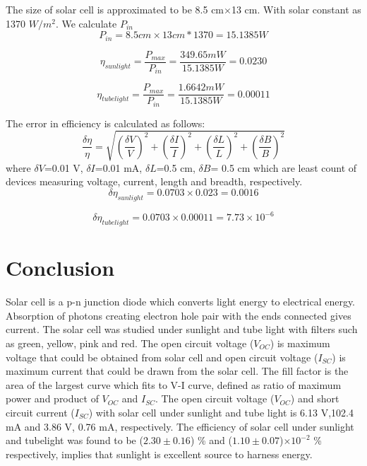 \documentclass[a4paper, amsfonts, amssymb, amsmath, reprint, showkeys, nofootinbib, twoside]{revtex4-1}
\begin{document}
The size of solar cell is approximated to be 8.5 cm$\times$13 cm. With solar constant as 1370  $W/m^{2}$. We calculate $P_{in}$
\begin{equation}
	P_{in}=8.5 cm\times 13 cm*1370=15.1385 W
\end{equation}

\begin{equation}
	\eta_{sunlight}=\frac{P_{max}}{P_{in}}=\frac{349.65 mW}{15.1385 W}=0.0230  
\end{equation}

\begin{equation}
	\eta_{tubelight}=\frac{P_{max}}{P_{in}}=\frac{1.6642 mW}{15.1385 W}=0.00011
\end{equation}

The error in efficiency is calculated as follows:
\begin{equation}
\frac{\delta \eta}{ \eta}=\sqrt{\left( \frac{\delta V}{V}\right) ^{2}+\left( \frac{\delta I}{I}\right) ^{2}+\left( \frac{\delta L}{L}\right) ^{2}+\left( \frac{\delta B}{B}\right) ^{2}}
\end{equation}
where $\delta V$=0.01 V, $\delta I$=0.01 mA, $\delta L$=0.5 cm, $\delta B$= 0.5 cm which are least count of devices measuring voltage, current, length and breadth, respectively.
\begin{equation}
	\delta \eta_{sunlight}=0.0703\times0.023=0.0016
\end{equation}

\begin{equation}
	\delta \eta_{tubelight}=0.0703\times0.00011=7.73\times10^{-6}
\end{equation}

\section{Conclusion}
Solar cell is a p-n junction diode which converts light energy to electrical energy. Absorption of photons creating electron hole pair with the ends connected gives current. The solar cell was studied under sunlight and tube light with filters such as green, yellow, pink and red. The open circuit voltage ($V_{OC}$) is maximum voltage that could be obtained from solar cell and open circuit voltage ($I_{SC}$) is maximum current that could be drawn from the solar cell. The fill factor is the area of the largest curve which fits to V-I curve, defined as ratio of maximum power and product of $V_{OC}$ and $I_{SC}$. The open circuit voltage ($V_{OC}$) and short circuit current ($I_{SC}$) with solar cell under sunlight and tube light is 6.13 V,102.4 mA and 3.86 V, 0.76 mA, respectively. The efficiency of solar cell under sunlight and tubelight was found to be ($2.30\pm0.16$) \% and 
($1.10\pm0.07$)$\times10^{-2}$ \% respectively, implies that sunlight is excellent source to harness energy. 
\end{document}

